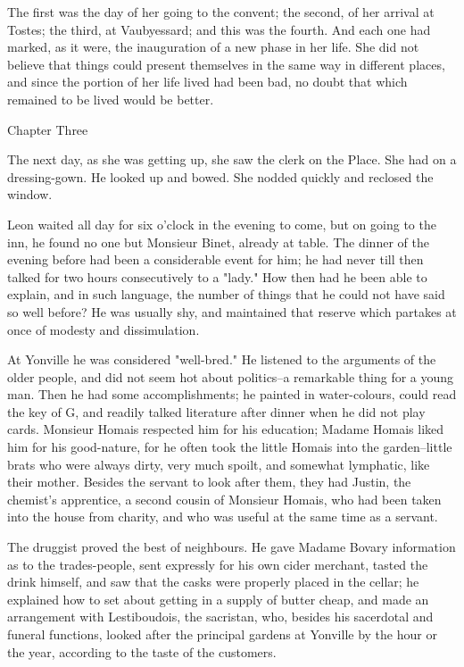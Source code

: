 \documentclass[11pt,twocolumn]{ltugboat}
\begin{document}
The first was the day of her going to the convent; the second, of her
arrival at Tostes; the third, at Vaubyessard; and this was the fourth.
And each one had marked, as it were, the inauguration of a new phase in
her life. She did not believe that things could present themselves in
the same way in different places, and since the portion of her life
lived had been bad, no doubt that which remained to be lived would be
better.



Chapter Three

The next day, as she was getting up, she saw the clerk on the Place. She
had on a dressing-gown. He looked up and bowed. She nodded quickly and
reclosed the window.

Leon waited all day for six o'clock in the evening to come, but on going
to the inn, he found no one but Monsieur Binet, already at table. The
dinner of the evening before had been a considerable event for him; he
had never till then talked for two hours consecutively to a "lady." How
then had he been able to explain, and in such language, the number of
things that he could not have said so well before? He was usually
shy, and maintained that reserve which partakes at once of modesty and
dissimulation.

At Yonville he was considered "well-bred." He listened to the arguments
of the older people, and did not seem hot about politics--a remarkable
thing for a young man. Then he had some accomplishments; he painted in
water-colours, could read the key of G, and readily talked literature
after dinner when he did not play cards. Monsieur Homais respected him
for his education; Madame Homais liked him for his good-nature, for
he often took the little Homais into the garden--little brats who were
always dirty, very much spoilt, and somewhat lymphatic, like their
mother. Besides the servant to look after them, they had Justin, the
chemist's apprentice, a second cousin of Monsieur Homais, who had been
taken into the house from charity, and who was useful at the same time
as a servant.

The druggist proved the best of neighbours. He gave Madame Bovary
information as to the trades-people, sent expressly for his own cider
merchant, tasted the drink himself, and saw that the casks were properly
placed in the cellar; he explained how to set about getting in a
supply of butter cheap, and made an arrangement with Lestiboudois, the
sacristan, who, besides his sacerdotal and funeral functions, looked
after the principal gardens at Yonville by the hour or the year,
according to the taste of the customers.
\end{document}

